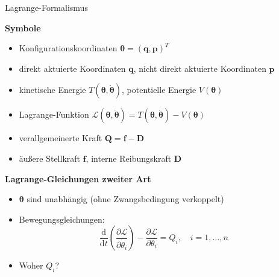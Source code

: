\documentclass[
	ngerman,
	10pt,				%
	aspectratio=169 	%
]{beamer}
\begin{document}
\begin{frame}[t,fragile,label=Lagrange2_1]{\large Lagrange-Formalismus}
	
	\textbf{Symbole}
	\begin{itemize}
		\item Konfigurationskoordinaten $\boldsymbol{\theta} = (\mathbf{q}, \mathbf{p})^T$
		\pause
		\item direkt aktuierte Koordinaten $\mathbf{q}$, nicht direkt aktuierte Koordinaten $\mathbf{p}$
		\pause
		\item kinetische Energie $T(\boldsymbol{\theta}, \dot{\boldsymbol{\theta}})$, potentielle Energie $V(\boldsymbol{\theta})$
		\pause
		\item Lagrange-Funktion $\mathcal{L}(\boldsymbol{\theta}, \dot{\boldsymbol{\theta}}) = T(\boldsymbol{\theta}, \dot{\boldsymbol{\theta}}) - V(\boldsymbol{\theta})$
		\pause
		\item verallgemeinerte Kraft $\mathbf{Q} = \mathbf{f} - \mathbf{D}$
		\pause
		\item äußere Stellkraft $\mathbf{f}$, interne Reibungskraft $\mathbf{D}$
	\end{itemize}
	
	\pause
	\bigskip
	\textbf{Lagrange-Gleichungen zweiter Art}
	\begin{itemize}
		\pause
		\item  $\boldsymbol{\theta}$ sind unabhängig (ohne Zwangsbedingung verkoppelt)
		\pause
		\item Bewegungsgleichungen:
		\begin{equation*}
			\frac{\mathrm{d}}{\mathrm{d} t} \left(\frac{\partial \mathcal{L}}{\partial \dot{\theta}_i} \right) - \frac{\partial \mathcal{L}}{\partial \theta_i} = Q_i, \quad i = 1, \ldots, n
		\end{equation*}
		\pause
		\item Woher $Q_i$?
	\end{itemize}
	
\end{frame}

\end{document}
